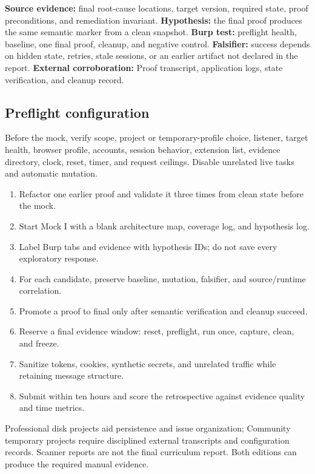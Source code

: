 \documentclass[11pt]{article}
\newcommand{\weekfield}[2]{%
  \Needspace{5\baselineskip}
  \subsection*{#1}
  #2
}
\newcommand{\externalproof}[1]{\textbf{External corroboration:} #1}
\begin{document}
\begin{bridgebox}
\textbf{Source evidence:} final root-cause locations, target version, required
state, proof preconditions, and remediation invariant. \textbf{Hypothesis:} the
final proof produces the same semantic marker from a clean snapshot.
\textbf{Burp test:} preflight health, baseline, one final proof, cleanup, and
negative control. \textbf{Falsifier:} success depends on hidden state, retries,
stale sessions, or an earlier artifact not declared in the report.
\externalproof{Proof transcript, application logs, state verification, and
cleanup record.}
\end{bridgebox}

\weekfield{Preflight configuration}{Before the mock, verify scope, project or
temporary-profile choice, listener, target health, browser profile, accounts,
session behavior, extension list, evidence directory, clock, reset, timer, and
request ceilings. Disable unrelated live tasks and automatic mutation.}

\begin{procedurebox}
\begin{enumerate}
  \item Refactor one earlier proof and validate it three times from clean state before the mock.
  \item Start Mock I with a blank architecture map, coverage log, and hypothesis log.
  \item Label Burp tabs and evidence with hypothesis IDs; do not save every exploratory response.
  \item For each candidate, preserve baseline, mutation, falsifier, and source/runtime correlation.
  \item Promote a proof to final only after semantic verification and cleanup succeed.
  \item Reserve a final evidence window: reset, preflight, run once, capture, clean, and freeze.
  \item Sanitize tokens, cookies, synthetic secrets, and unrelated traffic while retaining message structure.
  \item Submit within ten hours and score the retrospective against evidence quality and time metrics.
\end{enumerate}
\end{procedurebox}

\begin{editionbox}
Professional disk projects aid persistence and issue organization; Community
temporary projects require disciplined external transcripts and configuration
records. Scanner reports are not the final curriculum report. Both editions can
produce the required manual evidence.
\end{editionbox}
\end{document}

